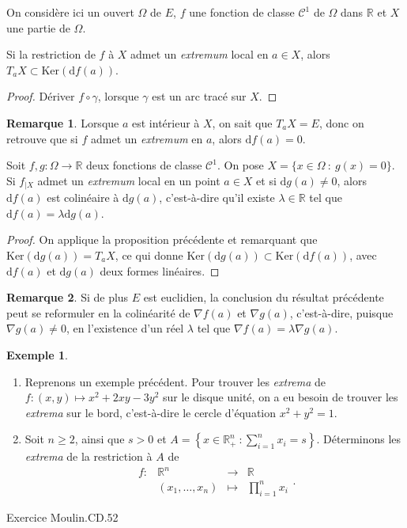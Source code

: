 \documentclass[french]{article}
\newcommand{\R}{\mathbb{R}}
\renewcommand{\ker}{\text{Ker}}
\renewcommand{\d}{\text{d}}
\theoremstyle{plain}
\theoremstyle{definition}
\newtheorem*{ex}{Exemple}
\newtheorem*{rmq}{Remarque}
\theoremstyle{remark}
\begin{document}
On considère ici un ouvert $\Omega$ de $E$, $f$ une fonction de classe $\mathcal{C}^1$ de $\Omega$ dans $\R$ et $X$ une partie de $\Omega$.

\begin{prop}%
	Si la restriction de $f$ à $X$ admet un \textit{extremum} local en $a\in X$, alors $T_aX\subset\ker(\d f(a))$.
\end{prop}
\begin{proof}
	Dériver $f\circ\gamma$, lorsque $\gamma$ est un arc tracé sur $X$.
\end{proof}

\begin{rmq}
	Lorsque $a$ est intérieur à $X$, on sait que $T_aX=E$, donc on retrouve que si $f$ admet un \textit{extremum} en $a$, alors $\d f(a)=0$.
\end{rmq}

\begin{thm}%
	Soit $f,g:\Omega\to\R$ deux fonctions de classe $\mathcal{C}^1$. On pose $X=\{x\in\Omega\ :\ g(x)=0\}$.\\
	Si $f_{\mid X}$ admet un \textit{extremum} local en un point $a\in X$ et si $\d g(a)\ne 0$, alors $\d f(a)$ est colinéaire à $\d g(a)$, c'est-à-dire qu'il existe $\lambda\in\R$ tel que $\d f(a)=\lambda\d g(a)$.
\end{thm}
\begin{proof}
	On applique la proposition précédente et remarquant que $\ker(\d g(a))=T_aX$, ce qui donne $\ker(\d g(a))\subset\ker(\d f(a))$, avec $\d f(a)$ et $\d g(a)$ deux formes linéaires.
\end{proof}

\begin{rmq}
	Si de plus $E$ est euclidien, la conclusion du résultat précédente peut se reformuler en la colinéarité de $\nabla f(a)$ et $\nabla g(a)$, c'est-à-dire, puisque $\nabla g(a)\ne 0$, en l'existence d'un réel $\lambda$ tel que $\nabla f(a)=\lambda\nabla g(a)$.
\end{rmq}

\begin{ex}
	\begin{enumerate}
		\item Reprenons un exemple précédent. Pour trouver les \textit{extrema} de $f:(x,y)\mapsto x^2+2xy-3y^2$ sur le disque unité, on a eu besoin de trouver les \textit{extrema} sur le bord, c'est-à-dire le cercle d'équation $x^2+y^2=1$.
		\item Soit $n\geqslant 2$, ainsi que $s>0$ et $A=\displaystyle\left\{x\in\R_+^n\ :\sum_{i=1}^{n}x_i=s\right\}$. Déterminons les \textit{extrema} de la restriction à $A$ de $$\begin{array}{lrcl}
			f:&\R^n&\longrightarrow&\R\\
			&(x_1,\ldots,x_n)&\longmapsto&\displaystyle\prod_{i=1}^{n}x_i
		\end{array}.$$
	\end{enumerate}
\end{ex}

Exercice Moulin.CD.52
\end{document}
